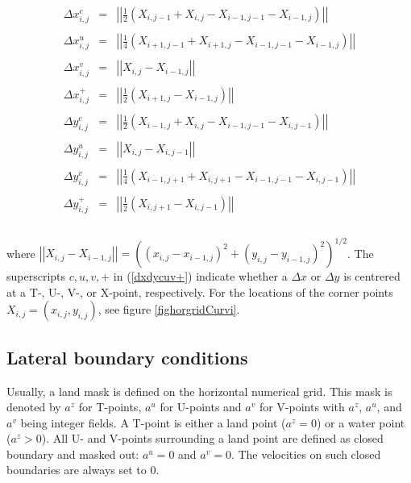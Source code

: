\begin{equation}\label{dxdycuv+}
\begin{array}{rcl}
\Delta x^c_{i,j}&=&\left|\left|
\frac12(X_{i,j-1}+X_{i,j}-X_{i-1,j-1}-X_{i-1,j}) 
\right|\right|\\ \\
\Delta x^u_{i,j}&=&\left|\left|
\frac14(X_{i+1,j-1}+X_{i+1,j}-X_{i-1,j-1}-X_{i-1,j})\right|\right| \\ \\
\Delta x^v_{i,j}&=& \left|\left|X_{i,j}-X_{i-1,j}\right|\right| \\ \\
\Delta x^+_{i,j}&=&\left|\left|
\frac12(X_{i+1,j}-X_{i-1,j})\right|\right| \\ \\
\Delta y^c_{i,j}&=&\left|\left|
\frac12(X_{i-1,j}+X_{i,j}-X_{i-1,j-1}-X_{i,j-1})\right|\right| \\ \\
\Delta y^u_{i,j}&=&\left|\left|X_{i,j}-X_{i,j-1}\right|\right|
 \\ \\
\Delta y^v_{i,j}&=&\left|\left|
\frac14(X_{i-1,j+1}+X_{i,j+1}-X_{i-1,j-1}-X_{i,j-1})\right|\right| \\ \\
\Delta y^+_{i,j}&=&\left|\left|
\frac12(X_{i,j+1}-X_{i,j-1})\right|\right| \\ \\
\end{array} 
\end{equation}

where $\left|\left|X_{i,j}-X_{i-1,j}\right|\right|
=\left((x_{i,j}-x_{i-1,j})^2+(y_{i,j}-y_{i-1,j})^2\right) ^{1/2}$.
The superscripts $c,u,v,+$ in (\ref{dxdycuv+}) indicate whether a $\Delta x$ or
$\Delta y$ is centrered at a T-, U-, V-, or X-point, respectively.  
For the locations of the corner points $X_{i,j}=(x_{i,j},y_{i,j})$, 
see figure \ref{fighorgridCurvi}. 


\subsection{Lateral boundary conditions}

Usually, a land mask is defined on the horizontal numerical grid.
This mask is denoted by $a^z$\label{az} for T-points, $a^u$\label{au} 
for U-points
and $a^v$\label{av} 
for V-points with $a^z$, $a^u$, and $a^v$ being integer fields. 
A T-point is either a land point ($a^z=0$) or a water point ($a^z>0$).
All U- and V-points surrounding a land point are defined as
closed boundary and masked out: $a^u=0$ and $a^v=0$.
The velocities on such closed boundaries are always set to 0.

